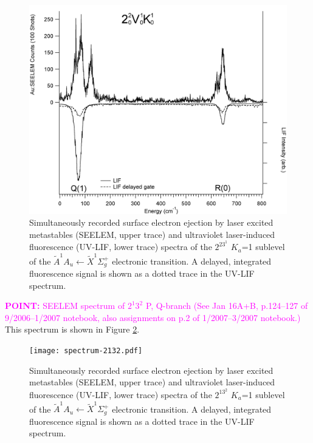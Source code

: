 \documentclass[12pt,draft]{mitthesis}
\newcommand{\POINT}[1]{\textcolor{magenta}{\textbf{POINT:} #1}}
\begin{document}
\begin{figure}
  \caption{
    Simultaneously recorded surface electron ejection by laser excited
    metastables (SEELEM, upper trace) and ultraviolet laser-induced
    fluorescence (UV-LIF, lower trace) spectra of the $2^23^1$ $K_a$=1
    sublevel of the $\tilde{A}^1A_u \leftarrow \tilde{X} ^1\Sigma_g^+$
    electronic transition. A delayed, integrated fluorescence signal
    is shown as a dotted trace in the UV-LIF spectrum.}
  \label{fig:spectrum-2231-q1r0}
  \centering
  \includegraphics[width=6in]{spectrum-2231-Q1R0.png}
\end{figure}

\POINT{SEELEM spectrum of $2^1 3^2$ P, Q-branch (See Jan 16A+B,
  p.124--127 of 9/2006--1/2007 notebook, also assignments on p.2 of
  1/2007--3/2007 notebook.)}  This spectrum is shown in Figure
\ref{fig:spectrum-2132}.

\begin{figure}
  \caption{
    Simultaneously recorded surface electron ejection by laser excited
    metastables (SEELEM, upper trace) and ultraviolet laser-induced
    fluorescence (UV-LIF, lower trace) spectra of the $2^13^2$ $K_a$=1
    sublevel of the $\tilde{A}^1A_u \leftarrow \tilde{X} ^1\Sigma_g^+$
    electronic transition. A delayed, integrated fluorescence signal
    is shown as a dotted trace in the UV-LIF spectrum.}
  \label{fig:spectrum-2132}
  \centering
  \texttt{[image: spectrum-2132.pdf]}
\end{figure}
\end{document}
